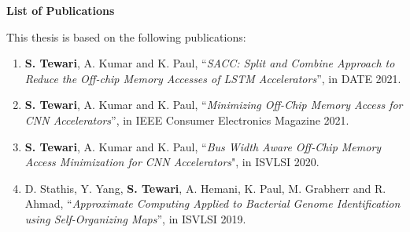 {}
\begin{center}
	{\Huge \textbf{List of Publications}} 
\end{center}
This thesis is based on the following publications:



\begin{enumerate}
	\item \textbf{S. Tewari}, A. Kumar and K. Paul, ``\textit{SACC: Split and Combine Approach to Reduce the Off-chip Memory Accesses of LSTM Accelerators}'', in DATE 2021.
	
	\item \textbf{S. Tewari}, A. Kumar and K. Paul, ``\textit{Minimizing Off-Chip Memory Access for CNN Accelerators}'', in IEEE Consumer Electronics Magazine 2021.
	
	\item \textbf{S. Tewari}, A. Kumar and K. Paul, ``\textit{Bus Width Aware Off-Chip Memory Access Minimization for CNN Accelerators}", in ISVLSI 2020.
	
	\item D. Stathis, Y. Yang, \textbf{S. Tewari}, A. Hemani, K. Paul, M. Grabherr and R. Ahmad, ``\textit{Approximate Computing Applied to Bacterial Genome Identification using Self-Organizing Maps}'', in ISVLSI 2019.
	
	\setcounter{saveenum}{\value{enumi}}
\end{enumerate}
